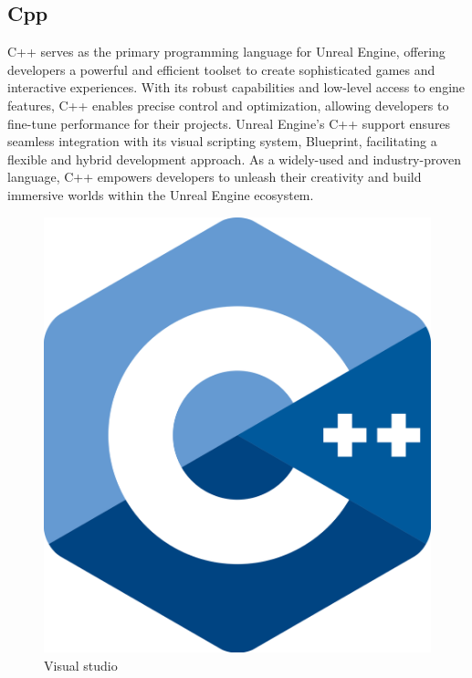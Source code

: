 \documentclass[12pt]{book}
\begin{document}
\subsection{Cpp}
C++ serves as the primary programming language for Unreal Engine, offering developers a powerful and efficient toolset to create sophisticated games and interactive experiences. With its robust capabilities and low-level access to engine features, C++ enables precise control and optimization, allowing developers to fine-tune performance for their projects. Unreal Engine's C++ support ensures seamless integration with its visual scripting system, Blueprint, facilitating a flexible and hybrid development approach. As a widely-used and industry-proven language, C++ empowers developers to unleash their creativity and build immersive worlds within the Unreal Engine ecosystem.
\begin{figure}[!h]
    \centering
    \includegraphics[scale=0.04]{./Figures/Images/cpp.png}
    \caption{Visual studio}
    \label{Visual studio}
\end{figure}
\end{document}
